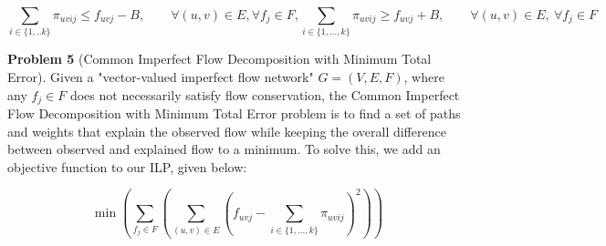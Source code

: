 \documentclass{article}
\begin{document}
\begin{subequations}
    \begin{equation}
        \sum_{i\in \{1,..k\}}\pi_{uvij}\leq f_{uvj}-B,\qquad \forall (u,v) \in E, \forall f_j \in F,
    \end{equation}
    \begin{equation}
        \sum_{i\in\{1,...,k\}}\pi_{uvij}\geq f_{uvj}+B, \qquad \forall(u,v)\in E, \ \forall f_j\in F
    \end{equation}
\end{subequations}

\textbf{Problem 5} (Common Imperfect Flow Decomposition with Minimum Total Error). Given a "vector-valued imperfect flow network" $G = (V,E,F)$, where any $f_j\in F$ does not necessarily satisfy flow conservation, the Common Imperfect Flow Decomposition with Minimum Total Error problem is to find a set of paths and weights that explain the observed flow while keeping the overall difference between observed and explained flow to a minimum. To solve this, we add an objective function to our ILP, given below:

\begin{equation}
    \min(\sum_{f_j\in F}(\sum_{(u,v)\in E}(f_{uvj}-\sum_{i\in{\{1,...,k\}}}\pi_{uvij})^2))
\end{equation}
\end{document}
